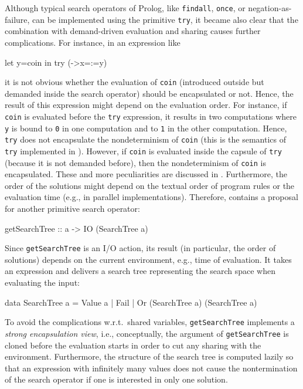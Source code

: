 \documentclass[english]{lni}
\newcommand{\code}[1]{\texttt{#1}}
\begin{document}
Although typical search operators of Prolog,
like \code{findall}, \code{once}, or negation-as-failure,
can be implemented using the primitive \code{try},
it became also clear that the combination with demand-driven evaluation
and sharing causes further complications.
For instance, in an expression like
\begin{curry}
let y=coin in try (\x->x=:=y)
\end{curry}
it is not obvious whether the evaluation of \code{coin} (introduced outside
but demanded inside the search operator) should be encapsulated or not.
Hence, the result of this expression might depend on the evaluation order.
For instance,
if \code{coin} is evaluated before the \code{try} expression,
it results in two computations where \code{y} is bound to \code{0}
in one computation and to \code{1} in the other computation.
Hence, \code{try} does not encapsulate the nondeterminism of \code{coin}
(this is the semantics of \code{try} implemented in \cite{Lux99FLOPS}).
However, if \code{coin} is evaluated inside the capsule of \code{try}
(because it is not demanded before), then the nondeterminism of
\code{coin} is encapsulated.
These and more peculiarities are discussed in \cite{BrasselHanusHuch04JFLP}.
Furthermore, the order of the solutions might depend on the
textual order of program rules or the evaluation time
(e.g., in parallel implementations).
Therefore, \cite{BrasselHanusHuch04JFLP} contains a proposal
for another primitive search operator:
\begin{curry}
getSearchTree :: a -> IO (SearchTree a)
\end{curry}
Since \code{getSearchTree} is an I/O action, its result (in particular,
the order of solutions) depends on the current environment, e.g.,
time of evaluation.
It takes an expression and delivers a search tree representing
the search space when evaluating the input:
\begin{curry}
data SearchTree a = Value a | Fail | Or (SearchTree a) (SearchTree a)
\end{curry}
To avoid the complications w.r.t.\ shared variables,
\code{getSearchTree} implements a \emph{strong encapsulation view},
i.e., conceptually, the argument of \code{getSearchTree}
is cloned before the evaluation starts in order to cut any sharing
with the environment.
Furthermore, the structure of the search tree is computed lazily
so that an expression with infinitely many values does not cause
the nontermination of the search operator if one is interested in only
one solution.
\end{document}
